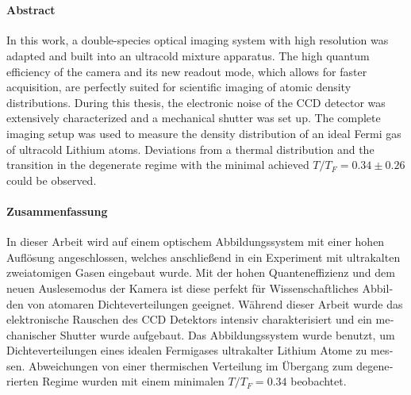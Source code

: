 \cleardoublepage
\thispagestyle{plain}

\makeatletter
\begin{center}
	\large\textbf{\@title}\\
	\normalsize\@author
\end{center}
\makeatother

\paragraph{Abstract}
In this work, a double-species optical imaging system with high resolution was adapted and built into an ultracold mixture apparatus. The high quantum efficiency of the camera and its new readout mode, which allows for faster acquisition, are perfectly suited for scientific imaging of atomic density distributions. During this thesis, the electronic noise of the CCD detector was extensively characterized and a mechanical shutter was set up. The complete imaging setup was used to measure the density distribution of an ideal Fermi gas of ultracold Lithium atoms. Deviations from a thermal distribution and the transition in the degenerate regime with the minimal achieved $T/T_F=0.34\pm0.26$ could be observed.


\begin{otherlanguage}{ngerman}

\paragraph{Zusammenfassung}
In dieser Arbeit wird auf einem optischem Abbildungssystem mit einer hohen Auflösung angeschlossen, welches anschließend in ein Experiment mit ultrakalten zweiatomigen Gasen eingebaut wurde. Mit der hohen Quanteneffizienz und dem neuen Auslesemodus der Kamera ist diese perfekt für Wissenschaftliches Abbilden von atomaren Dichteverteilungen geeignet. Während dieser Arbeit wurde das elektronische Rauschen des CCD Detektors intensiv charakterisiert und ein mechanischer Shutter wurde aufgebaut. Das Abbildungssystem wurde benutzt, um Dichteverteilungen eines idealen Fermigases ultrakalter Lithium Atome zu messen. Abweichungen von einer thermischen Verteilung im Übergang zum degenerierten Regime wurden mit einem minimalen $T/T_F=0.34$ beobachtet.

\end{otherlanguage}
